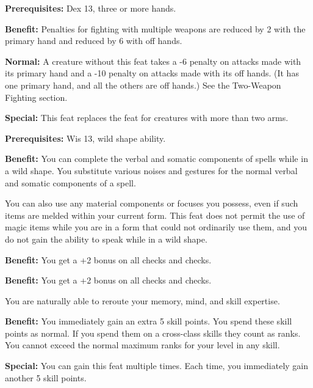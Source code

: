 
\textbf{Prerequisites:} Dex 13, three or more hands.

\textbf{Benefit:} Penalties for fighting with multiple weapons are reduced by 2 
with the primary hand and reduced by 6 with off hands.

\textbf{Normal:} A creature without this feat takes a -6 penalty on attacks made 
with its primary hand and a -10 penalty on attacks made with its off hands. (It 
has one primary hand, and all the others are off hands.) See the Two-Weapon Fighting section.

\textbf{Special:} This feat replaces the  feat for creatures 
with more than two arms.


\textbf{Prerequisites:} Wis 13, wild shape ability.

\textbf{Benefit:} You can complete the verbal and somatic components of spells 
while in a wild shape. You substitute various noises and gestures for the normal 
verbal and somatic components of a spell.

You can also use any material components or focuses you possess, even if such items 
are melded within your current form. This feat does not permit the use of magic 
items while you are in a form that could not ordinarily use them, and you do not 
gain the ability to speak while in a wild shape.


\textbf{Benefit:} You get a +2 bonus on all  checks and  checks.


\textbf{Benefit:} You get a +2 bonus on all  checks and  
checks.


You are naturally able to reroute your memory, mind, and skill expertise.

\textbf{Benefit:} You immediately gain an extra 5 skill points. You spend these 
skill points as normal. If you spend them on a cross-class skills they count as 
 ranks. You cannot exceed the normal maximum ranks for your level in any skill. 

\textbf{Special:} You can gain this feat multiple times. Each time, you immediately 
gain another 5 skill points.

